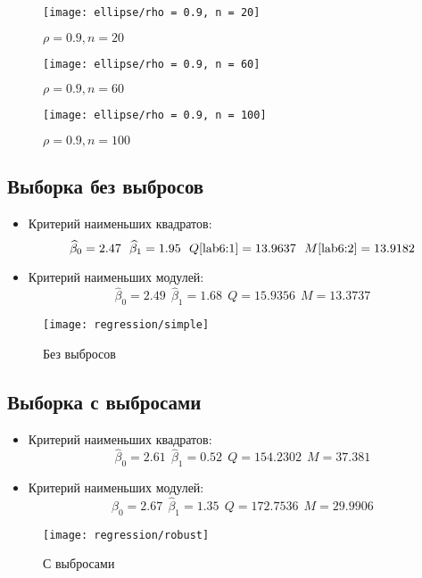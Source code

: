 \documentclass[12pt,a4paper]{article}
\begin{document}
\begin{figure}[h!]
	\centering
	\texttt{[image: ellipse/rho = 0.9, n = 20]}
	\caption{$\rho = 0.9, n = 20$}
	\label{fig:image7}
\end{figure}
\begin{figure}[h!]
	\centering
	\texttt{[image: ellipse/rho = 0.9, n = 60]}
	\caption{$\rho = 0.9, n = 60$}
	\label{fig:image8}
\end{figure}
\pagebreak

\begin{figure}[h!]
	\centering
	\texttt{[image: ellipse/rho = 0.9, n = 100]}
	\caption{$\rho = 0.9, n = 100$}
	\label{fig:image9}
\end{figure}
\pagebreak

\subsection{Выборка без выбросов}
\begin{itemize}
	\item Критерий наименьших квадратов:
	$$\widehat{\beta}_0 = 2.47 \ \ \widehat{\beta}_1 = 1.95 \ \ Q\eqref{lab6:1} = 13.9637  \ \ M\eqref{lab6:2} = 13.9182$$
	\item Критерий наименьших модулей:
	$$\widehat{\beta}_0 = 2.49 \ \ \widehat{\beta}_1 = 1.68 \ \ Q = 15.9356 \ \ M = 13.3737$$
\end{itemize}
\begin{figure}[h!]
	\centering
	\texttt{[image: regression/simple]}
	\caption{Без выбросов}
	\label{fig:image10}
\end{figure}

\pagebreak
\subsection{Выборка с выбросами}
\begin{itemize}
	\item Критерий наименьших квадратов:
	$$\widehat{\beta}_0 = 2.61 \ \ \widehat{\beta}_1 = 0.52 \ \ Q  = 154.2302  \ \ M = 37.381$$
	\item Критерий наименьших модулей:
	$$\widehat{\beta}_0 = 2.67 \ \ \widehat{\beta}_1 = 1.35 \ \ Q = 172.7536 \ \ M = 29.9906$$
\end{itemize}
\begin{figure}[h!]
	\centering
	\texttt{[image: regression/robust]}
	\caption{С выбросами}
	\label{fig:image11}
\end{figure}
\pagebreak
\end{document}
